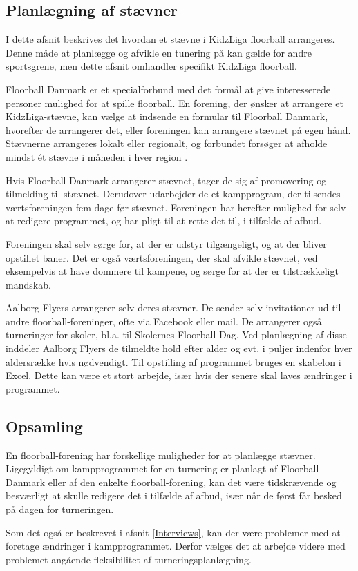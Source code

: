 \subsection{Planlægning af stævner}
I dette afsnit beskrives det hvordan et stævne i KidzLiga floorball arrangeres. Denne måde at planlægge og afvikle en tunering på kan gælde for andre sportsgrene, men dette afsnit omhandler specifikt KidzLiga floorball.
\par
Floorball Danmark er et specialforbund med det formål at give interesserede personer mulighed for at spille floorball. En forening, der ønsker at arrangere et KidzLiga-stævne, kan vælge at indsende en formular til Floorball Danmark, hvorefter de arrangerer det, eller foreningen kan arrangere stævnet på egen hånd. Stævnerne arrangeres lokalt eller regionalt, og forbundet forsøger at afholde mindst ét stævne i måneden i hver region \citep{kidzRegler}.
\par
Hvis Floorball Danmark arrangerer stævnet, tager de sig af promovering og tilmelding til stævnet. Derudover udarbejder de et kampprogram, der tilsendes værtsforeningen fem dage før stævnet. Foreningen har herefter mulighed for selv at redigere programmet, og har pligt til at rette det til, i tilfælde af afbud.
\par
Foreningen skal selv sørge for, at der er udstyr tilgængeligt, og at der bliver opstillet baner. Det er også værtsforeningen, der skal afvikle stævnet, ved eksempelvis at have dommere til kampene, og sørge for at der er tilstrækkeligt mandskab\citep{kidzRegler}. 
\par
Aalborg Flyers arrangerer selv deres stævner. De sender selv invitationer ud til andre floorball-foreninger, ofte via Facebook eller mail. De arrangerer også turneringer for skoler, bl.a. til Skolernes Floorball Dag. Ved planlægning af disse inddeler Aalborg Flyers de tilmeldte hold efter alder og evt. i puljer indenfor hver aldersrække hvis nødvendigt. Til opstilling af programmet bruges en skabelon i Excel. Dette kan være et stort arbejde, især hvis der senere skal laves ændringer i programmet.

\subsection*{Opsamling} 
En floorball-forening har forskellige muligheder for at planlægge stævner. Ligegyldigt om kampprogrammet for en turnering er planlagt af Floorball Danmark eller af den enkelte floorball-forening, kan det være tidskrævende og besværligt at skulle redigere det i tilfælde af afbud, især når de først får besked på dagen for turneringen.
\par
Som det også er beskrevet i afsnit \ref{Interviews}, kan der være problemer med at foretage ændringer i kampprogrammet. Derfor vælges det at arbejde videre med problemet angående fleksibilitet af turneringsplanlægning.

